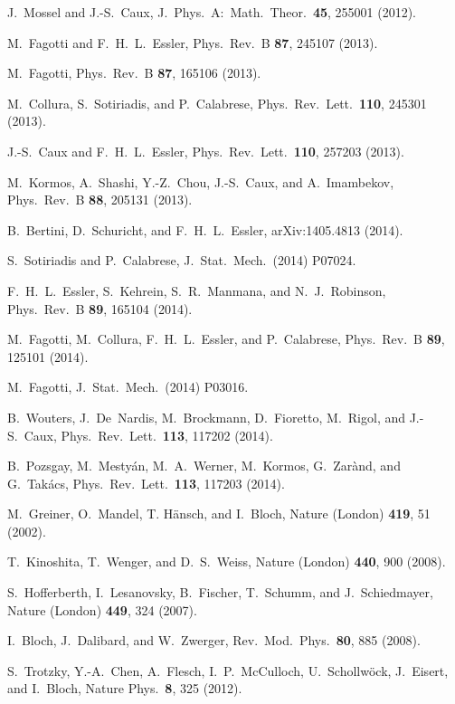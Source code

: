\documentclass[twocolumn,superscriptaddress,prb,10pt]{revtex4-1}
\begin{document}
\begin{thebibliography}{99}
J.~Mossel and J.-S.~Caux, J.\ Phys.\ A:\ Math.\ Theor.\ {\bf 45}, 
255001 (2012). 

M.~Fagotti and F.~H.~L.~Essler, Phys.\ Rev.\ B {\bf 87}, 245107 (2013).

M.~Fagotti, Phys.\ Rev.\ B {\bf 87}, 165106 (2013). 


M.~Collura, S.~Sotiriadis, and P.~Calabrese, Phys.\ Rev.\ Lett.\ 
{\bf 110}, 245301 (2013). 

J.-S.~Caux and F.~H.~L.~Essler, Phys.\ Rev.\ Lett.\ {\bf 110}, 
257203 (2013). 

M.~Kormos, A.~Shashi, Y.-Z.~Chou, J.-S.~Caux, and A.~Imambekov, 
Phys.\ Rev.\ B {\bf 88}, 205131 (2013). 

B.~Bertini, D.~Schuricht, and F.~H.~L.~Essler, arXiv:1405.4813 (2014).

S.~Sotiriadis and P.~Calabrese, J.\ Stat.\ Mech.\ (2014) P07024. 

F.~H.~L.~Essler, S.~Kehrein, S.~R.~Manmana, and N.~J.~Robinson, Phys.\ Rev.\ 
B {\bf 89}, 165104 (2014).

M.~Fagotti, M.~Collura, F.~H.~L.~Essler, and P.~Calabrese, Phys.\ Rev.\ B 
{\bf 89}, 125101 (2014).

M.~Fagotti, J.\ Stat.\ Mech.\ (2014) P03016. 

B.~Wouters, J.~De~Nardis, M.~Brockmann, D.~Fioretto, M.~Rigol, and 
J.-S.~Caux, Phys.\ Rev.\ Lett.\ {\bf 113}, 117202 (2014). 

B.~Pozsgay, M.~Mesty\'an, M.~A.~Werner, M.~Kormos, G.~Zar\`and, and 
G.~Tak\'acs, Phys.\ Rev.\ Lett.\ {\bf 113}, 117203 (2014).

M.~Greiner, O.~Mandel, T. H\"ansch, and I.~Bloch, Nature (London) 
{\bf 419}, 51 (2002). 

T.~Kinoshita, T.~Wenger, and D.~S.~Weiss, Nature (London) {\bf 440}, 
900 (2008).

S.~Hofferberth, I.~Lesanovsky, B.~Fischer, T.~Schumm, and J.~Schiedmayer, 
Nature (London) {\bf 449}, 324 (2007). 

I.~Bloch, J.~Dalibard, and W.~Zwerger, Rev.\ Mod.\ Phys.\ {\bf 80}, 
885 (2008).

S.~Trotzky, Y.-A.~Chen, A.~Flesch, I.~P.~McCulloch, U.~Schollw\"ock, 
J.~Eisert, and I.~Bloch, Nature Phys.\ {\bf 8}, 325 (2012).


\end{thebibliography}
\end{document}
